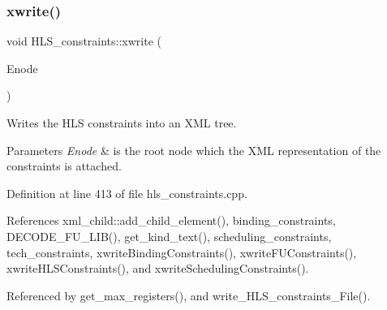 \subsubsection{\texorpdfstring{xwrite()}{xwrite()}}
{\footnotesize\ttfamily void H\+L\+S\+\_\+constraints\+::xwrite (\begin{DoxyParamCaption}\item[{\hyperlink{classxml__element}{xml\+\_\+element} $\ast$}]{Enode }\end{DoxyParamCaption})}



Writes the H\+LS constraints into an X\+ML tree. 


\begin{DoxyParams}{Parameters}
{\em Enode} & is the root node which the X\+ML representation of the constraints is attached. \\
\hline
\end{DoxyParams}


Definition at line 413 of file hls\+\_\+constraints.\+cpp.



References xml\+\_\+child\+::add\+\_\+child\+\_\+element(), binding\+\_\+constraints, D\+E\+C\+O\+D\+E\+\_\+\+F\+U\+\_\+\+L\+I\+B(), get\+\_\+kind\+\_\+text(), scheduling\+\_\+constraints, tech\+\_\+constraints, xwrite\+Binding\+Constraints(), xwrite\+F\+U\+Constraints(), xwrite\+H\+L\+S\+Constraints(), and xwrite\+Scheduling\+Constraints().



Referenced by get\+\_\+max\+\_\+registers(), and write\+\_\+\+H\+L\+S\+\_\+constraints\+\_\+\+File().


